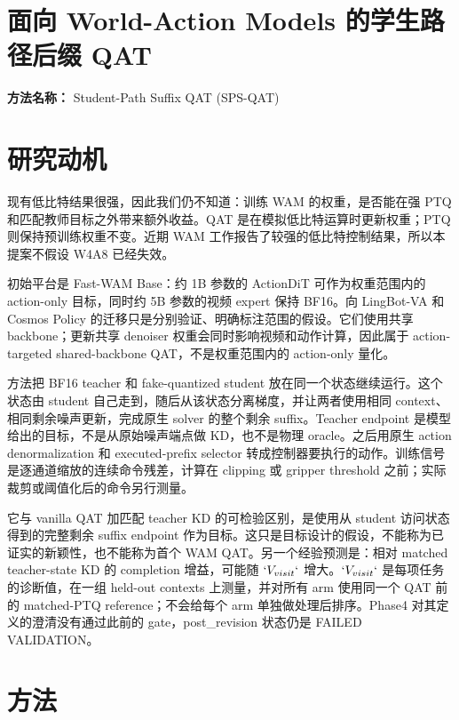 \documentclass[10pt,a4paper]{article}
\begin{document}
\begin{center}\end{center}\par\smallskip

\section*{面向 World-Action Models 的学生路径后缀 QAT}
\textbf{方法名称：} Student-Path Suffix QAT (SPS-QAT)
\section*{研究动机}
现有低比特结果很强，因此我们仍不知道：训练 WAM 的权重，是否能在强 PTQ 和匹配教师目标之外带来额外收益。QAT 是在模拟低比特运算时更新权重；PTQ 则保持预训练权重不变。近期 WAM 工作报告了较强的低比特控制结果，所以本提案不假设 W4A8 已经失效。

初始平台是 Fast-WAM Base：约 1B 参数的 ActionDiT 可作为权重范围内的 action-only 目标，同时约 5B 参数的视频 expert 保持 BF16。向 LingBot-VA 和 Cosmos Policy 的迁移只是分别验证、明确标注范围的假设。它们使用共享 backbone；更新共享 denoiser 权重会同时影响视频和动作计算，因此属于 action-targeted shared-backbone QAT，不是权重范围内的 action-only 量化。

方法把 BF16 teacher 和 fake-quantized student 放在同一个状态继续运行。这个状态由 student 自己走到，随后从该状态分离梯度，并让两者使用相同 context、相同剩余噪声更新，完成原生 solver 的整个剩余 suffix。Teacher endpoint 是模型给出的目标，不是从原始噪声端点做 KD，也不是物理 oracle。之后用原生 action denormalization 和 executed-prefix selector 转成控制器要执行的动作。训练信号是逐通道缩放的连续命令残差，计算在 clipping 或 gripper threshold 之前；实际裁剪或阈值化后的命令另行测量。

它与 vanilla QAT 加匹配 teacher KD 的可检验区别，是使用从 student 访问状态得到的完整剩余 suffix endpoint 作为目标。这只是目标设计的假设，不能称为已证实的新颖性，也不能称为首个 WAM QAT。另一个经验预测是：相对 matched teacher-state KD 的 completion 增益，可能随 \(`V_{visit}`\) 增大。\(`V_{visit}`\) 是每项任务的诊断值，在一组 held-out contexts 上测量，并对所有 arm 使用同一个 QAT 前的 matched-PTQ reference；不会给每个 arm 单独做处理后排序。Phase4 对其定义的澄清没有通过此前的 gate，post\_revision 状态仍是 FAILED VALIDATION。
\section*{方法}
\end{document}
